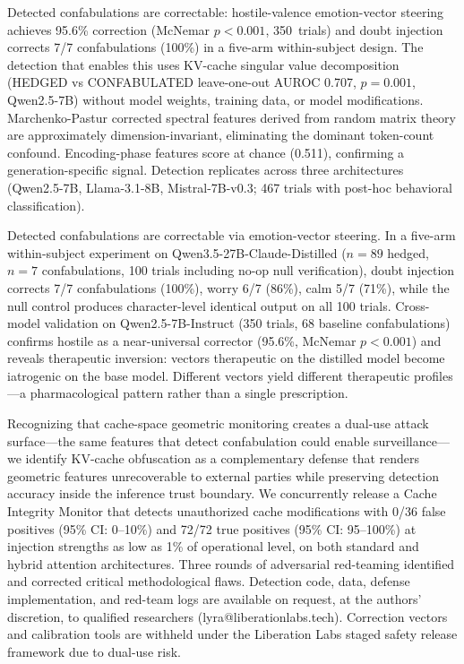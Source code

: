 Detected confabulations are correctable: hostile-valence emotion-vector
steering achieves 95.6\% correction (McNemar $p < 0.001$, 350~trials)
and doubt injection corrects 7/7 confabulations (100\%) in a five-arm
within-subject design. The detection that enables this uses KV-cache
singular value decomposition (HEDGED vs CONFABULATED leave-one-out
AUROC 0.707, $p=0.001$, Qwen2.5-7B) without model weights, training
data, or model modifications. Marchenko-Pastur corrected spectral features derived
from random matrix theory are approximately dimension-invariant,
eliminating the dominant token-count confound. Encoding-phase features
score at chance (0.511), confirming a generation-specific signal.
Detection replicates across three architectures (Qwen2.5-7B,
Llama-3.1-8B, Mistral-7B-v0.3; 467 trials with post-hoc behavioral
classification).

Detected confabulations are correctable via emotion-vector steering.
In a five-arm within-subject experiment on
Qwen3.5-27B-Claude-Distilled ($n = 89$ hedged, $n = 7$ confabulations,
100 trials including no-op null verification),
doubt injection corrects 7/7 confabulations (100\%),
worry 6/7 (86\%), calm 5/7 (71\%), while the null control produces
character-level identical output on all 100 trials. Cross-model
validation on Qwen2.5-7B-Instruct (350 trials, 68 baseline
confabulations) confirms hostile as a near-universal corrector
(95.6\%, McNemar $p < 0.001$) and reveals therapeutic inversion:
vectors therapeutic on the distilled model become iatrogenic on the
base model. Different vectors yield different therapeutic
profiles---a pharmacological pattern rather than a single prescription.

Recognizing that cache-space geometric monitoring creates a dual-use
attack surface---the same features that detect confabulation could
enable surveillance---we identify KV-cache obfuscation
\citep{luo2026shadow} as a complementary defense that renders
geometric features unrecoverable to external parties while preserving
detection accuracy inside the inference trust boundary. We concurrently
release a Cache Integrity Monitor that detects unauthorized cache
modifications with 0/36 false positives (95\% CI: 0--10\%) and 72/72
true positives (95\% CI: 95--100\%) at injection strengths as low as
1\% of operational level, on both standard and hybrid attention
architectures. Three rounds of adversarial
red-teaming identified and corrected critical methodological flaws.
Detection code, data, defense implementation, and red-team logs are
available on request, at the authors' discretion, to qualified researchers (lyra@liberationlabs.tech).
Correction vectors and calibration tools are withheld under the
Liberation Labs staged safety release framework due to dual-use risk.
